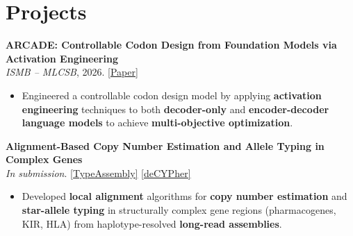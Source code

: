 \documentclass[letterpaper,11pt]{article}
\newcommand{\paperentry}[2]{%
  \textbf{#1}\\[1pt]
  #2
}
\begin{document}
\section{Projects}

\paperentry
  {ARCADE: Controllable Codon Design from Foundation Models via Activation Engineering}
  {\textit{ISMB -- MLCSB}, 2026. \href{https://www.biorxiv.org/content/10.1101/2025.08.19.668819v2}{[Paper]}}
\begin{itemize}
  \item Engineered a controllable codon design model by applying \textbf{activation engineering} techniques to both \textbf{decoder-only} and \textbf{encoder-decoder language models} to achieve \textbf{multi-objective optimization}.
\end{itemize}

\vspace{2pt}
\paperentry
  {Alignment-Based Copy Number Estimation and Allele Typing in Complex Genes}
  {\textit{In submission}. \href{https://www.biorxiv.org/content/10.1101/2025.09.13.675996v1}{[TypeAssembly]} \href{https://www.biorxiv.org/content/10.1101/2025.10.13.681303v2}{[deCYPher]}}
\begin{itemize}
  \item Developed \textbf{local alignment} algorithms for \textbf{copy number estimation} and \textbf{star-allele typing} in structurally complex gene regions (pharmacogenes, KIR, HLA) from haplotype-resolved \textbf{long-read assemblies}.
\end{itemize}
\end{document}
